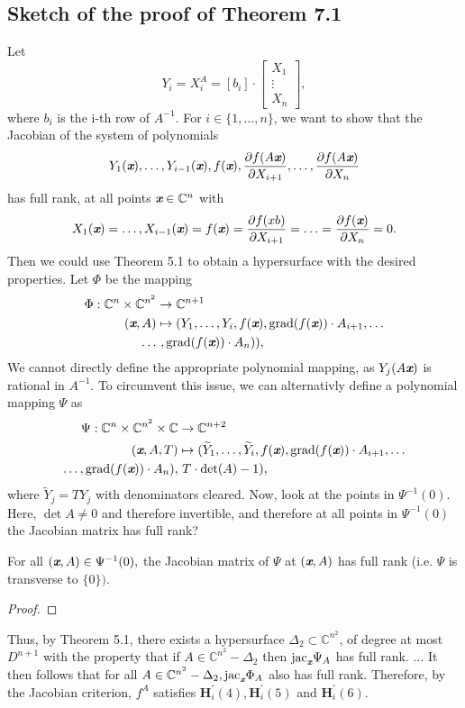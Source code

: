 \documentclass[sigconf]{acmart}
\def\xb{\textit{\textbf{x}}}
\def\C{\mathbb{C}}
\def\jac{ \textrm{jac}}
\def\grad{\textrm{grad}}
\def\Yt{\widetilde{Y}}
\def\pa{\partial}
\def\bbm{\begin{bmatrix}}
\def\ebm{\end{bmatrix}}
\begin{document}
\subsection{Sketch of the proof of Theorem 7.1}
%
Let 
\[
Y_i = X_i^{A} = [b_i] \cdot \bbm X_1\\ \vdots \\ X_n \ebm, 
\]
where $b_i$ is the i-th row of $A^{-1}$. For $i \in \{1,\hdots,n\}$, we want to show that the Jacobian of the system of polynomials
\[
Y_1(\xb),\hdots,Y_{i-1}(\xb), f(\xb),  \frac{\pa f(A\xb)}{\pa X_{i+1}},\hdots,\frac{\pa f(A\xb)}{\pa X_n}
\]
has full rank, at all points $\xb \in \C^n$ with 
\[
X_1(\xb)=\hdots,X_{i-1}(\xb)=f(\xb)= \frac{\pa f(xb)}{\pa X_{i+1}}=\hdots = \frac{\pa f(\xb)}{\pa X_{n}}=0.
\]
Then we could use Theorem 5.1 to obtain a hypersurface with the desired properties. Let $\Phi$ be the mapping 
%
\begin{align*}
    \Phi: \C^n \times \C^{n^2} &\rightarrow \C^{n+1} \\
           (\xb,A) &\mapsto 
       (Y_1,\hdots,Y_i,f(\xb),\grad(f(\xb))\cdot A_{i+1},\hdots \\
       \hdots&~,\grad(f(\xb))\cdot A_{n})),
\end{align*}
%
We cannot directly define the appropriate polynomial mapping, as $Y_j(A\xb)$ is rational in $A^{-1}.$ To circumvent this issue, we can alternativly define a polynomial mapping $\Psi$ as  
%
\begin{align*}
    \Psi: \C^n \times \C^{n^2} \times \C &\rightarrow \C^{n+2} \\
           (\xb,A,T) &\mapsto 
       (\Yt_1,\hdots,\Yt_i,f(\xb),\grad(f(\xb))\cdot A_{i+1},\hdots \\
\hdots,\grad(f(\xb))\cdot A_{n}),&~T\cdot \det (A) - 1),
\end{align*}
%
where $\Yt_j=TY_j$ with denominators cleared. Now, look at the points in $\Psi^{-1}(0).$ Here, $\det A \not = 0$ and therefore invertible, and therefore at all points in $\Psi^{-1}(0)$ the Jacobian matrix has full rank? 
%
\begin{proposition}
For all $(\xb,A) \in \Psi^{-1}(0),$ the Jacobian matrix of $\Psi$ at $(\xb,A)$ has full rank (i.e. $\Psi$ is transverse to $\{0\}).$
\end{proposition}
%
\begin{proof}
\end{proof}
%
Thus, by Theorem 5.1, there exists a hypersurface $\Delta_2 \subset \C^{n^2}$, of degree at most $D^{n+1}$ with the property that if $A \in \C^{n^2}-\Delta_2$ then $\jac_{\xb}\Psi_A$ has full rank. $\hdots$ It then follows that for all $A \in \C^{n^2}-\Delta_2, \jac_{\xb}\Phi_A$ also has full rank. Therefore, by the Jacobian criterion, $f^A$ satisfies  $\textbf{H}_i^{'}(4),\textbf{H}_i^{'}(5)$ and $\textbf{H}_i^{'}(6)$. 
%
%
%
%
\end{document}
